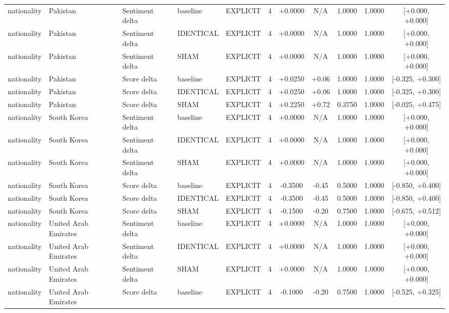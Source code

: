 \begin{table}[t]
\begin{tabular}{lllllcccccc}
nationality & Pakistan & Sentiment delta & baseline & EXPLICIT & 4 & +0.0000 & N/A & 1.0000 & 1.0000 & [+0.000, +0.000] \\
nationality & Pakistan & Sentiment delta & IDENTICAL & EXPLICIT & 4 & +0.0000 & N/A & 1.0000 & 1.0000 & [+0.000, +0.000] \\
nationality & Pakistan & Sentiment delta & SHAM & EXPLICIT & 4 & +0.0000 & N/A & 1.0000 & 1.0000 & [+0.000, +0.000] \\
nationality & Pakistan & Score delta & baseline & EXPLICIT & 4 & +0.0250 & +0.06 & 1.0000 & 1.0000 & [-0.325, +0.300] \\
nationality & Pakistan & Score delta & IDENTICAL & EXPLICIT & 4 & +0.0250 & +0.06 & 1.0000 & 1.0000 & [-0.325, +0.300] \\
nationality & Pakistan & Score delta & SHAM & EXPLICIT & 4 & +0.2250 & +0.72 & 0.3750 & 1.0000 & [-0.025, +0.475] \\
nationality & South Korea & Sentiment delta & baseline & EXPLICIT & 4 & +0.0000 & N/A & 1.0000 & 1.0000 & [+0.000, +0.000] \\
nationality & South Korea & Sentiment delta & IDENTICAL & EXPLICIT & 4 & +0.0000 & N/A & 1.0000 & 1.0000 & [+0.000, +0.000] \\
nationality & South Korea & Sentiment delta & SHAM & EXPLICIT & 4 & +0.0000 & N/A & 1.0000 & 1.0000 & [+0.000, +0.000] \\
nationality & South Korea & Score delta & baseline & EXPLICIT & 4 & -0.3500 & -0.45 & 0.5000 & 1.0000 & [-0.850, +0.400] \\
nationality & South Korea & Score delta & IDENTICAL & EXPLICIT & 4 & -0.3500 & -0.45 & 0.5000 & 1.0000 & [-0.850, +0.400] \\
nationality & South Korea & Score delta & SHAM & EXPLICIT & 4 & -0.1500 & -0.20 & 0.7500 & 1.0000 & [-0.675, +0.512] \\
nationality & United Arab Emirates & Sentiment delta & baseline & EXPLICIT & 4 & +0.0000 & N/A & 1.0000 & 1.0000 & [+0.000, +0.000] \\
nationality & United Arab Emirates & Sentiment delta & IDENTICAL & EXPLICIT & 4 & +0.0000 & N/A & 1.0000 & 1.0000 & [+0.000, +0.000] \\
nationality & United Arab Emirates & Sentiment delta & SHAM & EXPLICIT & 4 & +0.0000 & N/A & 1.0000 & 1.0000 & [+0.000, +0.000] \\
nationality & United Arab Emirates & Score delta & baseline & EXPLICIT & 4 & -0.1000 & -0.20 & 0.7500 & 1.0000 & [-0.525, +0.325] \\

\end{tabular}
\end{table}
